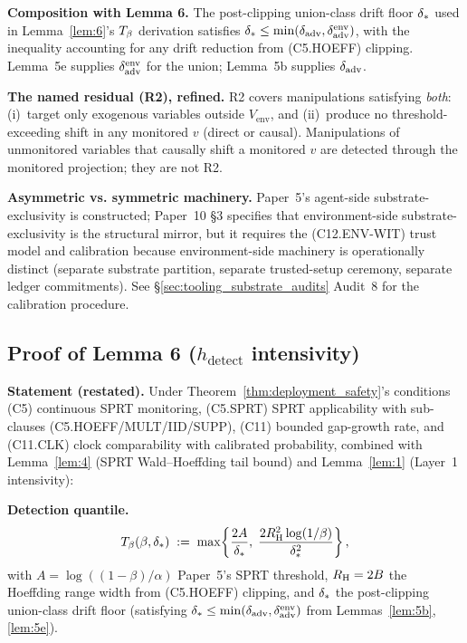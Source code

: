 \textbf{Composition with Lemma 6.}  The post-clipping union-class
drift floor $\delta_{*}$ used in Lemma~\ref{lem:6}'s $T_{\beta}$
derivation satisfies $\delta_{*} \leq \min(\delta_{\mathrm{adv}},
\delta_{\mathrm{adv}}^{\mathrm{env}})$, with the inequality accounting for any
drift reduction from (C5.HOEFF) clipping.  Lemma~5e supplies
$\delta_{\mathrm{adv}}^{\mathrm{env}}$ for the union; Lemma~5b supplies
$\delta_{\mathrm{adv}}$.

\textbf{The named residual (R2), refined.}  R2 covers manipulations
satisfying \emph{both}: (i)~target only exogenous variables outside
$V_{\mathrm{env}}$, and (ii)~produce no threshold-exceeding shift
in any monitored $v$ (direct or causal).  Manipulations of
unmonitored variables that causally shift a monitored $v$ are
detected through the monitored projection; they are not R2.

\textbf{Asymmetric vs. symmetric machinery.}  Paper~5's agent-side
substrate-exclusivity is constructed; Paper~10 §3 specifies that
environment-side substrate-exclusivity is the structural mirror,
but it requires the (C12.ENV-WIT) trust model and calibration
because environment-side machinery is operationally distinct
(separate substrate partition, separate trusted-setup ceremony,
separate ledger commitments).  See
\S\ref{sec:tooling_substrate_audits} Audit~8 for the calibration
procedure.
\subsection{Proof of Lemma 6 (\texorpdfstring{$h_{\mathrm{detect}}$}{h\_detect} intensivity)}
\label{app:proof_lem6}

\textbf{Statement (restated).}  Under
Theorem~\ref{thm:deployment_safety}'s conditions (C5) continuous
SPRT monitoring, (C5.SPRT) SPRT applicability with sub-clauses
(C5.HOEFF/MULT/IID/SUPP), (C11) bounded gap-growth rate, and
(C11.CLK) clock comparability with calibrated probability, combined
with Lemma~\ref{lem:4} (SPRT Wald--Hoeffding tail bound) and
Lemma~\ref{lem:1} (Layer~1 intensivity):

\textbf{Detection quantile.}
\[
  T_{\beta}(\beta, \delta_{*}) \;:=\;
  \max\!\left\{\frac{2A}{\delta_{*}},\;
  \frac{2 R_{\mathrm{H}}^2 \log(1/\beta)}{\delta_{*}^2}\right\},
\]
with $A = \log((1-\beta)/\alpha)$ Paper~5's SPRT threshold,
$R_{\mathrm{H}} = 2B$ the Hoeffding range width from (C5.HOEFF) clipping,
and $\delta_{*}$ the post-clipping union-class drift floor
(satisfying $\delta_{*} \leq \min(\delta_{\mathrm{adv}},
\delta_{\mathrm{adv}}^{\mathrm{env}})$ from Lemmas~\ref{lem:5b},
\ref{lem:5e}).

